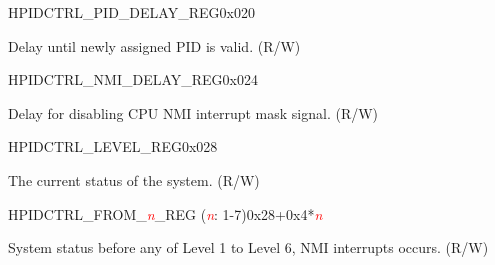     
    \begin{register}{H}{PIDCTRL\_PID\_DELAY\_REG}{0x020}\label{regdesc:PIDCTRLPIDDELAYREG}
    \regnewline%
    \begin{regdesc}\begin{reglist}
    \item [PIDCTRL\_PID\_DELAY]Delay until newly assigned PID is valid. (R/W)
    \end{reglist}\end{regdesc}
    \end{register}
    
    
    \begin{register}{H}{PIDCTRL\_NMI\_DELAY\_REG}{0x024}\label{regdesc:PIDCTRLNMIDELAYREG}
    \regnewline%
    \begin{regdesc}\begin{reglist}
    \item [PIDCTRL\_NMI\_DELAY]Delay for disabling CPU NMI interrupt mask signal. (R/W)
    \end{reglist}\end{regdesc}
    \end{register}
    
    
    \begin{register}{H}{PIDCTRL\_LEVEL\_REG}{0x028}\label{regdesc:PIDCTRLLEVELREG}
    \regnewline%
    \begin{regdesc}\begin{reglist}
    \item [PIDCTRL\_CURRENT\_STATUS]The current status of the system. (R/W)
    \end{reglist}\end{regdesc}
    \end{register}
    
    
    \begin{register}{H}{PIDCTRL\_FROM\_\textcolor{red}{\it{n}}\_REG (\textcolor{red}{\it{n}}: 1-7)}{0x28+0x4*\textcolor{red}{\it{n}}}\label{regdesc:PIDCTRLFROMnREG}
    \regnewline%
    \begin{regdesc}\begin{reglist}
    \item [PIDCTRL\_PREVIOUS\_STATUS\_\textcolor{red}{\it{n}}]System status before any of Level 1 to Level 6, NMI interrupts occurs. (R/W)
    \end{reglist}\end{regdesc}
    \end{register}
    
